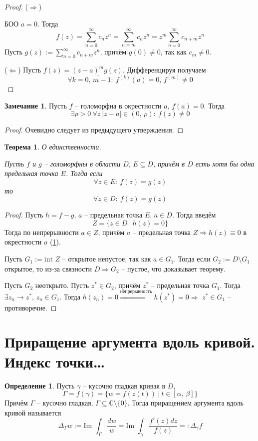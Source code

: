 \documentclass[a4paper,12pt]{article}
\theoremstyle{plain}
\newtheorem{theorem}{Теорема}[section]
\theoremstyle{definition}
\newtheorem{definition}{Определение}[section]
\newtheorem*{note}{Замечание}
\theoremstyle{remark}
\begin{document}
\begin{proof}
	($\Rightarrow$)

	БОО $a = 0$. Тогда
	\[
		f(z) = \sum_{n = 0}^\infty c_nz^n = \sum_{n = m}^\infty c_nz^n = z^m \sum_{n = 0}^\infty c_{n + m}z^n
	\]
	Пусть $g(z) :=\sum_{n = 0}^\infty c_{n + m}z^n$, причём $g(0) \neq 0$, так как $c_m \neq 0$.

	($\Leftarrow$) Пусть $f(z) = (z - a)^mg(z)$. Дифференцируя получаем
	\[
		\forall k = \overline{0,\,m-1} :\: f^{(k)}(a) = 0,\, f^{(m)} \neq 0
	\]
\end{proof}

\begin{note}\label{nonZero}
	Пусть $f$ -- голоморфна в окрестности $a,\, f(a) = 0$. Тогда
	\[
		\exists \rho > 0 \: \forall z \: \vert z - a\vert \in (0,\, \rho) :\: f(z) \neq 0
	\]
\end{note}

\begin{proof}
	Очевидно следует из предыдущего утверждения.
\end{proof}

\begin{theorem}
	О единственности.

	Пусть $f$ и $g$ -- голоморфны в области $D,\, E \subseteq D$, причём в $D$ есть хотя бы одна предельная точка $E$. Тогда если
	\[
		\forall z \in E :\: f(z) = g(z)
	\]
	то
	\[
		\forall z \in D :\: f(z) = g(z)
	\]
\end{theorem}

\begin{proof}
	Пусть $h = f - g,\, a $ -- предельная точка $E,\, a \in D$. Тогда введём
	\[
		Z = \{z \in D \:\vert\: h(z) = 0\}
	\]
	Тогда по непрерывности $a \in Z$, причём $a$ -- предельная точка $Z \Rightarrow h(z) \equiv 0$ в окрестности $a$ (\ref{nonZero}).

	Пусть $G_1 := \text{int }Z$ -- открытое непустое, так как $a \in G_1$. Тогда если $G_2 := D \setminus G_1$ открытое, то из-за связности $D \Rightarrow G_2$ -- пустое, что доказывает теорему.

	Пусть $G_2$ неоткрыто. Пусть $z^* \in G_2$, причём $z^*$ -- предельная точка $G_1$. Тогда $\exists z_n \to z^*,\, z_n \in G_1$. Тогда $h(z_n) = 0 \overset{\text{непрерывность}}{\Rightarrow} h(z^*) = 0 \Rightarrow$ $z^* \in G_1$ -- противоречие.
\end{proof}

\section{Приращение аргумента вдоль кривой. Индекс точки\dots}
\begin{definition}
	Пусть $\gamma$ -- кусочно гладкая кривая в $D$,
	\[
		\Gamma = f(\gamma) = \{w = f(z(t)) \:\vert\: t \in [\alpha,\, \beta]\}
	\]
	Причём $\Gamma$ -- кусочно гладкая, $\Gamma \subseteq \mathbb{C}\setminus\{0\}$. Тогда приращением аргумента вдоль кривой называется
	\[
		\Delta_\Gamma w := \text{Im }\int_\Gamma\frac{dw}{w} = \text{Im }\int_\gamma\frac{f'(z)dz}{f(z)} =: \Delta_\gamma f
	\]
\end{definition}
\end{document}
